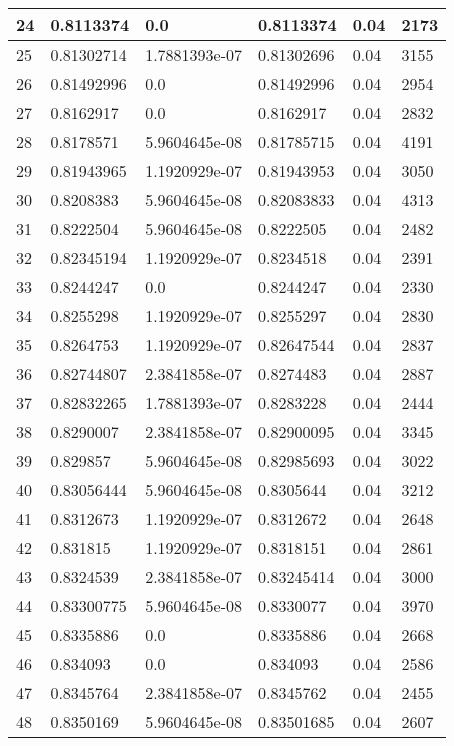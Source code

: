 \begin{longtable}{|l|l|l|l|l|l|}
24 & 0.8113374 & 0.0 & 0.8113374 & 0.04 & 2173 \\ \hline 
25 & 0.81302714 & 1.7881393e-07 & 0.81302696 & 0.04 & 3155 \\ \hline 
26 & 0.81492996 & 0.0 & 0.81492996 & 0.04 & 2954 \\ \hline 
27 & 0.8162917 & 0.0 & 0.8162917 & 0.04 & 2832 \\ \hline 
28 & 0.8178571 & 5.9604645e-08 & 0.81785715 & 0.04 & 4191 \\ \hline 
29 & 0.81943965 & 1.1920929e-07 & 0.81943953 & 0.04 & 3050 \\ \hline 
30 & 0.8208383 & 5.9604645e-08 & 0.82083833 & 0.04 & 4313 \\ \hline 
31 & 0.8222504 & 5.9604645e-08 & 0.8222505 & 0.04 & 2482 \\ \hline 
32 & 0.82345194 & 1.1920929e-07 & 0.8234518 & 0.04 & 2391 \\ \hline 
33 & 0.8244247 & 0.0 & 0.8244247 & 0.04 & 2330 \\ \hline 
34 & 0.8255298 & 1.1920929e-07 & 0.8255297 & 0.04 & 2830 \\ \hline 
35 & 0.8264753 & 1.1920929e-07 & 0.82647544 & 0.04 & 2837 \\ \hline 
36 & 0.82744807 & 2.3841858e-07 & 0.8274483 & 0.04 & 2887 \\ \hline 
37 & 0.82832265 & 1.7881393e-07 & 0.8283228 & 0.04 & 2444 \\ \hline 
38 & 0.8290007 & 2.3841858e-07 & 0.82900095 & 0.04 & 3345 \\ \hline 
39 & 0.829857 & 5.9604645e-08 & 0.82985693 & 0.04 & 3022 \\ \hline 
40 & 0.83056444 & 5.9604645e-08 & 0.8305644 & 0.04 & 3212 \\ \hline 
41 & 0.8312673 & 1.1920929e-07 & 0.8312672 & 0.04 & 2648 \\ \hline 
42 & 0.831815 & 1.1920929e-07 & 0.8318151 & 0.04 & 2861 \\ \hline 
43 & 0.8324539 & 2.3841858e-07 & 0.83245414 & 0.04 & 3000 \\ \hline 
44 & 0.83300775 & 5.9604645e-08 & 0.8330077 & 0.04 & 3970 \\ \hline 
45 & 0.8335886 & 0.0 & 0.8335886 & 0.04 & 2668 \\ \hline 
46 & 0.834093 & 0.0 & 0.834093 & 0.04 & 2586 \\ \hline 
47 & 0.8345764 & 2.3841858e-07 & 0.8345762 & 0.04 & 2455 \\ \hline 
48 & 0.8350169 & 5.9604645e-08 & 0.83501685 & 0.04 & 2607 \\ \hline 

\end{longtable}
